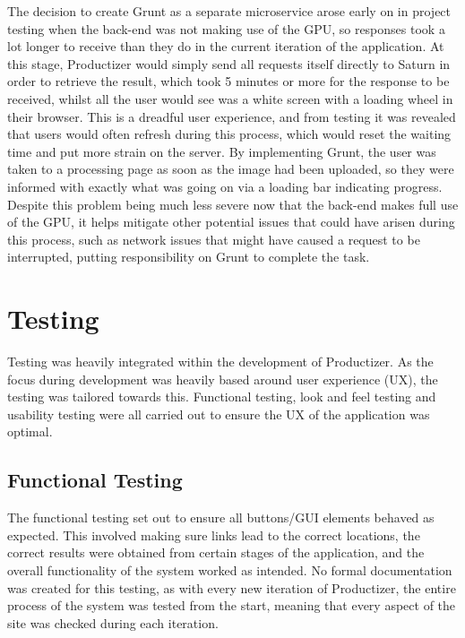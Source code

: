 The decision to create Grunt as a separate microservice arose early on in project testing when the back-end was not making use of the GPU, so responses took a lot longer to receive than they do in the current iteration of the application. At this stage, Productizer would simply send all requests itself directly to Saturn in order to retrieve the result, which took 5 minutes or more for the response to be received, whilst all the user would see was a white screen with a loading wheel in their browser. This is a dreadful user experience, and from testing it was revealed that users would often refresh during this process, which would reset the waiting time and put more strain on the server. By implementing Grunt, the user was taken to a processing page as soon as the image had been uploaded, so they were informed with exactly what was going on via a loading bar indicating progress. Despite this problem being much less severe now that the back-end makes full use of the GPU, it helps mitigate other potential issues that could have arisen during this process, such as network issues that might have caused a request to be interrupted, putting responsibility on Grunt to complete the task.

\section{Testing} \label{section:prod:testing}

Testing was heavily integrated within the development of Productizer. As the focus during development was heavily based around user experience (UX), the testing was tailored towards this. Functional testing, look and feel testing and usability testing were all carried out to ensure the UX of the application was optimal. 

\subsection{Functional Testing}

The functional testing set out to ensure all buttons/GUI elements behaved as expected. This involved making sure links lead to the correct locations, the correct results were obtained from certain stages of the application, and the overall functionality of the system worked as intended. No formal documentation was created for this testing, as with every new iteration of Productizer, the entire process of the system was tested from the start, meaning that every aspect of the site was checked during each iteration. 

